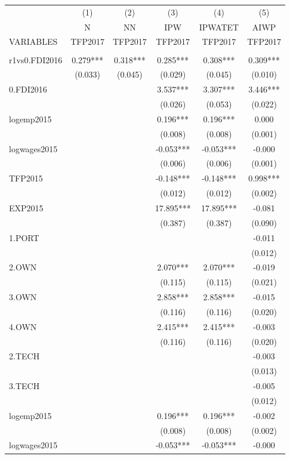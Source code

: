 \documentclass[]{article}
\begin{document}
\begin{tabular}{lccccc} \hline
 & (1) & (2) & (3) & (4) & (5) \\
 & N & NN & IPW & IPWATET & AIWP \\
VARIABLES & TFP2017 & TFP2017 & TFP2017 & TFP2017 & TFP2017 \\ \hline
 &  &  &  &  &  \\
r1vs0.FDI2016 & 0.279*** & 0.318*** & 0.285*** & 0.308*** & 0.309*** \\
 & (0.033) & (0.045) & (0.029) & (0.045) & (0.010) \\
0.FDI2016 &  &  & 3.537*** & 3.307*** & 3.446*** \\
 &  &  & (0.026) & (0.053) & (0.022) \\
logemp2015 &  &  & 0.196*** & 0.196*** & 0.000 \\
 &  &  & (0.008) & (0.008) & (0.001) \\
logwages2015 &  &  & -0.053*** & -0.053*** & -0.000 \\
 &  &  & (0.006) & (0.006) & (0.001) \\
TFP2015 &  &  & -0.148*** & -0.148*** & 0.998*** \\
 &  &  & (0.012) & (0.012) & (0.002) \\
EXP2015 &  &  & 17.895*** & 17.895*** & -0.081 \\
 &  &  & (0.387) & (0.387) & (0.090) \\
1.PORT &  &  &  &  & -0.011 \\
 &  &  &  &  & (0.012) \\
2.OWN &  &  & 2.070*** & 2.070*** & -0.019 \\
 &  &  & (0.115) & (0.115) & (0.021) \\
3.OWN &  &  & 2.858*** & 2.858*** & -0.015 \\
 &  &  & (0.116) & (0.116) & (0.020) \\
4.OWN &  &  & 2.415*** & 2.415*** & -0.003 \\
 &  &  & (0.116) & (0.116) & (0.020) \\
2.TECH &  &  &  &  & -0.003 \\
 &  &  &  &  & (0.013) \\
3.TECH &  &  &  &  & -0.005 \\
 &  &  &  &  & (0.012) \\
logemp2015 &  &  & 0.196*** & 0.196*** & -0.002 \\
 &  &  & (0.008) & (0.008) & (0.002) \\
logwages2015 &  &  & -0.053*** & -0.053*** & -0.000 \\

\end{tabular}
\end{document}
